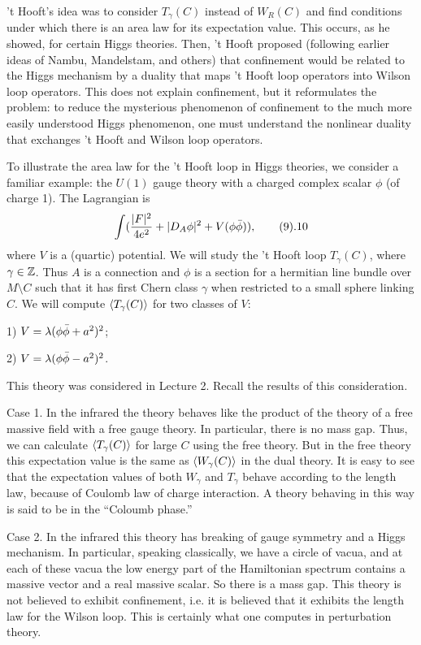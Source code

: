 't Hooft's idea was to consider $T_\gamma(C)$ instead of $W_R(C)$ 
and find conditions under which there is an
 area law for its expectation value.   This occurs, as he showed,
 for certain Higgs theories.  Then, 't Hooft proposed (following earlier
 ideas of Nambu, Mandelstam, and others) that confinement would be related
 to the Higgs mechanism by a duality that maps 't Hooft loop operators
 into  Wilson loop operators.  This does not explain confinement, but
 it reformulates the problem: to reduce the mysterious phenomenon of 
confinement
 to the much more easily understood Higgs phenomenon, one must understand
 the nonlinear duality that exchanges 't Hooft and Wilson loop operators.

To illustrate the area law for the 't Hooft loop in Higgs theories,
we consider a familiar example:
the $U(1)$ gauge theory with a charged complex scalar $\phi$ 
(of charge 1). The Lagrangian is
$$
\int(\frac{|F|^2}{4e^2}+|D_A\phi|^2+V(\phi\bar\phi)),\tag 9.10 
$$
where $V$ is a (quartic) potential. We will study the 't Hooft loop 
$T_\gamma(C)$, where $\gamma\in\Bbb Z$. Thus 
$A$ is a connection and $\phi$ is a section for a hermitian line bundle over 
$M\setminus C$ such that it has first Chern class $\gamma$ when restricted
to a small sphere linking $C$. We will compute 
$\langle T_\gamma(C)\rangle$ for two classes of $V$:

1) $V=\lambda(\phi\bar\phi+a^2)^2$;

2) $V=\lambda(\phi\bar\phi-a^2)^2$. 

This theory was considered in Lecture 2. Recall the results of this 
consideration. 

Case 1. In the infrared the theory behaves like the product 
of the theory of a free massive field with a free gauge theory. 
In particular, there is no mass gap. 
Thus, we can calculate $\langle T_\gamma(C)\rangle$ for large $C$ using the free theory. 
But in the free theory this expectation value 
 is the same as $\langle W_\gamma(C)\rangle$  
in the dual theory. It is easy to see that the expectation 
values of both $W_\gamma$ and $T_\gamma$ behave 
according to the length law, because of Coulomb law of charge interaction. 
A theory behaving in this way is said to be in the  ``Coloumb phase.''

Case 2. In the infrared this theory has breaking of gauge symmetry 
and a Higgs mechanism. In particular, speaking classically,
we have a circle of vacua, and at each of 
these vacua the low energy part of the Hamiltonian spectrum 
contains a massive vector and a real massive scalar. So there is a mass gap. 
This theory is not believed to exhibit confinement, i.e. it is believed 
that it exhibits the length law for the Wilson loop.  This is certainly
what one computes in perturbation theory.


